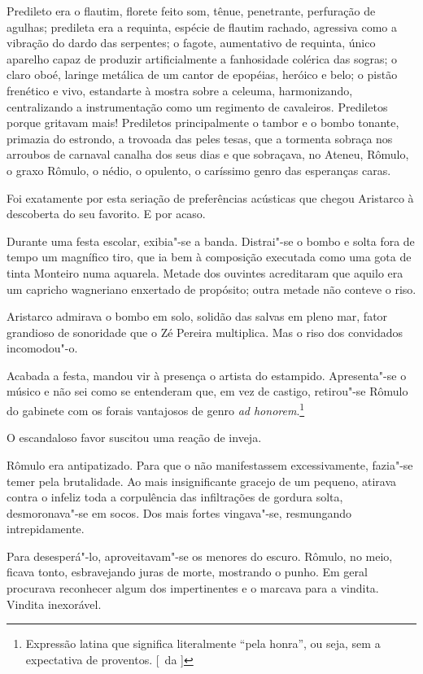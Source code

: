 Predileto era o flautim, florete feito som,
tênue, penetrante, perfuração de agulhas; predileta era a requinta,
espécie de flautim rachado, agressiva como a vibração do dardo das
serpentes; o fagote, aumentativo de requinta, único aparelho capaz de
produzir artificialmente a fanhosidade colérica das sogras; 
o claro oboé, laringe metálica de um cantor de epopéias, heróico
e belo; o pistão frenético e vivo, estandarte à mostra sobre a celeuma,
harmonizando, centralizando a instrumentação como um regimento de
cavaleiros. Prediletos porque gritavam mais! Prediletos principalmente
o tambor e o bombo tonante, primazia do estrondo, a trovoada das peles
tesas, que a tormenta sobraça nos arroubos de carnaval canalha dos seus
dias e que sobraçava, no Ateneu, Rômulo, o graxo Rômulo, o nédio, o
opulento, o caríssimo genro das esperanças caras. 

Foi exatamente por
esta seriação de preferências acústicas que chegou Aristarco à
descoberta do seu favorito. E por acaso. 

Durante uma festa escolar,
exibia"-se a banda. Distrai"-se o bombo e solta fora de tempo um
magnífico tiro, que ia bem à composição executada como uma gota de
tinta Monteiro numa aquarela. Metade dos ouvintes acreditaram que
aquilo era um capricho wagneriano enxertado de propósito; outra metade
não conteve o riso. 

Aristarco admirava o bombo em solo, solidão das
salvas em pleno mar, fator grandioso de sonoridade que o Zé Pereira
multiplica. Mas o riso dos convidados incomodou"-o. 

Acabada a festa,
mandou vir à presença o artista do estampido. Apresenta"-se o músico e
não sei como se entenderam que, em vez de castigo, retirou"-se Rômulo
do gabinete com os forais vantajosos de genro \textit{ad honorem}.\footnote{ Expressão latina que significa literalmente ``pela honra'', 
ou seja, sem a expectativa de proventos. [~da ]}

O escandaloso favor suscitou uma reação de inveja. 

Rômulo era antipatizado. 
Para que o não manifestassem excessivamente, fazia"-se temer pela brutalidade.
Ao mais insignificante gracejo de um pequeno, atirava contra o infeliz
toda a corpulência das infiltrações de gordura solta, desmoronava"-se
em socos. Dos mais fortes vingava"-se, resmungando intrepidamente.

Para desesperá"-lo, aproveitavam"-se os menores do escuro. Rômulo, no
meio, ficava tonto, esbravejando juras de morte, mostrando o punho. Em
geral procurava reconhecer algum dos impertinentes e o marcava para a
vindita. Vindita inexorável. 

